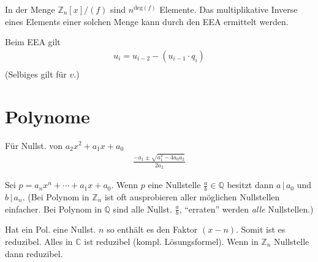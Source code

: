 \documentclass{article}
\begin{document}
\begin{multicols}{2}
In der Menge $\mathbb{Z}_n[x]/(f)$ sind $n^{\text{deg}(f)}$ Elemente. Das multiplikative Inverse eines Elements einer solchen Menge kann durch den EEA ermittelt werden.

Beim EEA gilt
\begin{align*}
    u_i = u_{i - 2} - (u_{i - 1} \cdot q_{i}) \\
\end{align*}
(Selbiges gilt für $v$.)

\section*{Polynome}

Für Nullst. von $a_2x^2 + a_1x + a_0$
\begin{align*}
    \frac{-a_1 \pm \sqrt{a_1^2 - 4a_0a_2}}{2a_2}
\end{align*}

Sei $p = a_nx^n + \cdots + a_1x + a_0$. Wenn $p$ eine Nullstelle $\frac{a}{b} \in \mathbb{Q}$ besitzt dann $a\,|\,a_0$ und $b\,|\,a_n$. (Bei Polynom in $\mathbb{Z}_n$ ist oft ausprobieren aller möglichen Nullstellen einfacher. Bei Polynom in $\mathbb{Q}$ sind alle Nullst. $\frac{a}{b}$, \enquote{erraten} werden \emph{alle} Nullstellen.) 

Hat ein Pol. eine Nullst. $n$ so enthält es den Faktor $(x - n)$. Somit ist es reduzibel. Alles in $\mathbb{C}$ ist reduzibel (kompl. Lösungsformel). Wenn in $\mathbb{Z}_n$ Nullstelle dann reduzibel.

\end{multicols}
\end{document}
